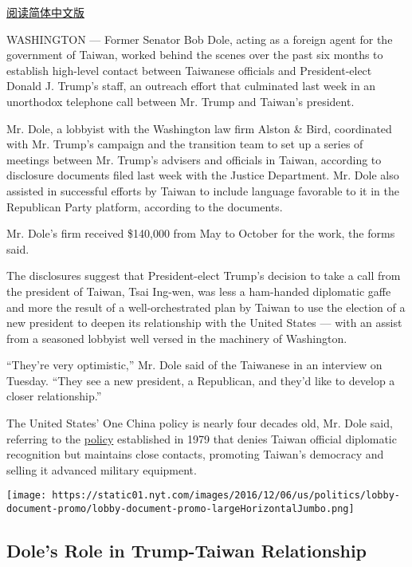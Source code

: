 \href{http://cn.nytimes.com/usa/20161207/bob-dole-taiwan-lobby-trump/}{阅读简体中文版}

WASHINGTON --- Former Senator Bob Dole, acting as a foreign agent for
the government of Taiwan, worked behind the scenes over the past six
months to establish high-level contact between Taiwanese officials and
President-elect Donald J. Trump's staff, an outreach effort that
culminated last week in an unorthodox telephone call between Mr. Trump
and Taiwan's president.

Mr. Dole, a lobbyist with the Washington law firm Alston \& Bird,
coordinated with Mr. Trump's campaign and the transition team to set up
a series of meetings between Mr. Trump's advisers and officials in
Taiwan, according to disclosure documents filed last week with the
Justice Department. Mr. Dole also assisted in successful efforts by
Taiwan to include language favorable to it in the Republican Party
platform, according to the documents.

Mr. Dole's firm received \$140,000 from May to October for the work, the
forms said.

The disclosures suggest that President-elect Trump's decision to take a
call from the president of Taiwan, Tsai Ing-wen, was less a ham-handed
diplomatic gaffe and more the result of a well-orchestrated plan by
Taiwan to use the election of a new president to deepen its relationship
with the United States --- with an assist from a seasoned lobbyist well
versed in the machinery of Washington.

``They're very optimistic,'' Mr. Dole said of the Taiwanese in an
interview on Tuesday. ``They see a new president, a Republican, and
they'd like to develop a closer relationship.''

The United States' One China policy is nearly four decades old, Mr. Dole
said, referring to the
\href{http://www.nytimes.com/2016/12/03/world/asia/trump-taiwan-and-china-the-controversy-explained.html}{policy}
established in 1979 that denies Taiwan official diplomatic recognition
but maintains close contacts, promoting Taiwan's democracy and selling
it advanced military equipment.

\href{https://www.nytimes.com/interactive/2016/12/06/us/politics/document-bob-dole-lobbying-documents.html}{}

\texttt{[image: https://static01.nyt.com/images/2016/12/06/us/politics/lobby-document-promo/lobby-document-promo-largeHorizontalJumbo.png]}

\hypertarget{doles-role-in-trump-taiwan-relationship}{%
\subsection{Dole's Role in Trump-Taiwan
Relationship}\label{doles-role-in-trump-taiwan-relationship}}

